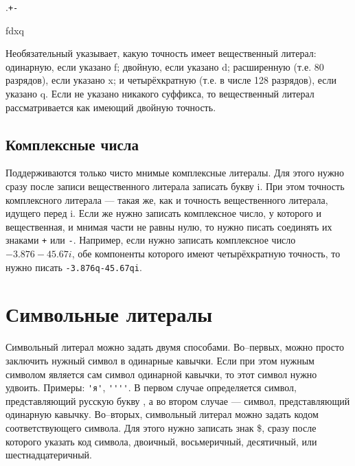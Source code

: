 \documentclass[10pt]{report}
\begin{document}
\is{}\rbo.\rbc\optional\rbo{}\rbc\rbo\texttt{+}\sor\texttt{-}\rbc\optional{}\rbc\optional{}\optional

\is{}

\is{}

\is{}

\is f\sor d\sor x\sor q

Необязательный  указывает, какую точность имеет вещественный литерал: одинарную, если указано f; двойную, если указано d; расширенную (т.е. 80 разрядов), если указано x; и четырёхкратную (т.е. в числе 128 разрядов), если указано q. Если не указано никакого суффикса, то вещественный литерал рассматривается как имеющий двойную точность.

\subsection{Комплексные числа}
Поддерживаются только чисто мнимые комплексные литералы. Для этого нужно сразу после записи вещественного литерала записать букву i. При этом точность комплексного литерала --- такая же, как и точность вещественного литерала, идущего перед i. Если же нужно записать комплексное число, у которого и вещественная, и мнимая части не равны нулю, то нужно писать соединять их знаками \texttt{+} или \texttt{-}. Например, если нужно записать комплексное число $-3.876-45.67i$, обе компоненты которого имеют четырёхкратную точность, то нужно писать \texttt{-3.876q-45.67qi}.

\section{Символьные литералы}
Символьный литерал можно задать двумя способами. Во--первых, можно просто заключить нужный символ в одинарные кавычки. Если при этом нужным символом является сам символ одинарной кавычки, то этот символ нужно удвоить. Примеры: \verb|'я'|, \verb|''''|. В первом случае определяется символ, представляющий русскую букву \grqq, а во втором случае --- символ, представляющий одинарную кавычку. Во--вторых, символьный литерал можно задать кодом соответствующего символа. Для этого нужно записать знак \$, сразу после которого указать код символа, двоичный, восьмеричный, десятичный, или шестнадцатеричный. 
\end{document}
